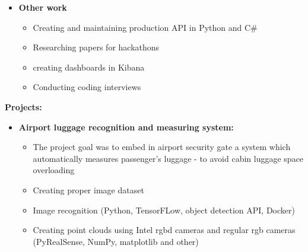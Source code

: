 \documentclass[10pt,a4paper,ragged2e,withhyper, normalphoto]{altacv}
\begin{document}
\begin{paracol}{2}
\begin{itemize}
        \item  \textbf{\textcolor{DarkPastelRed}{Other work}}
            \begin{itemize}
                \item Creating and maintaining production API in Python and C\#
                \item Researching papers for hackathons
                \item creating dashboards in Kibana
                \item Conducting coding interviews
            \end{itemize}
    \end{itemize}
    \divider
    
    \textbf{Projects:}
    \begin{itemize}
        \item \textbf{\textcolor{DarkPastelRed}{Airport luggage recognition and measuring system:}}
        \begin{itemize}
            \item The project goal was to embed in airport security gate a system which automatically measures passenger's luggage - to avoid cabin luggage space overloading
            \item Creating proper image dataset
            \item Image recognition (Python, TensorFLow, object detection API, Docker)
            \item Creating point clouds using Intel rgbd cameras and regular rgb cameras (PyRealSense, NumPy, matplotlib and other)
        \end{itemize}

\end{itemize}
\end{paracol}
\end{document}
